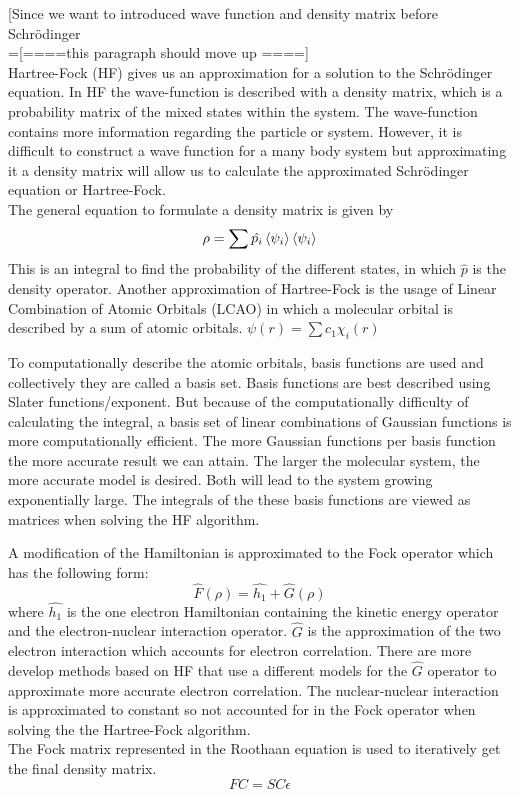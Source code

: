 \documentclass[twoside]{article}
\begin{document}
[Since we want to introduced wave function and density matrix before Schrödinger\\
=[====this paragraph should move up ====] \\
Hartree-Fock (HF) gives us an approximation for a solution to the Schrödinger equation. In HF the wave-function is described with a density matrix, which is a probability matrix of the mixed states within the system. The wave-function contains more information regarding the particle or system. However, it is difficult to construct a wave function for a many body system but approximating it a density matrix will allow us to calculate the approximated Schrödinger equation or Hartree-Fock. \\  

The general equation to formulate a density matrix is given by
\[
\rho = \sum\hat{p_i}\braket{\psi_i}\braket{\psi_i}
\]
This is an integral to find the probability of the different states, in which $\hat{p}$ is the density operator. Another approximation of Hartree-Fock is the usage of Linear Combination of Atomic Orbitals (LCAO) in which a molecular orbital is described by a sum of atomic orbitals. $\psi(r) = \sum{c_1\chi_i(r)}$


To computationally describe the atomic orbitals, basis functions are used and collectively they are called a basis set. Basis functions are best described using Slater functions/exponent. But because of the computationally difficulty of calculating the integral, a basis set of linear combinations of Gaussian functions is more computationally efficient. The more Gaussian functions per basis function the more accurate result we can attain. The larger the molecular system, the more accurate model is desired. Both will lead to the system growing exponentially large. The integrals of the these basis functions are viewed as matrices when solving the HF algorithm.

A modification of the Hamiltonian is approximated to the Fock operator which has the following form:
\[
\hat{F}(\rho) = \hat{h_1} + \hat{G}(\rho)
\]
where $\hat{h_1}$ is the one electron Hamiltonian containing the kinetic energy operator and the electron-nuclear interaction operator. $\hat{G}$ is the approximation of the two electron interaction which accounts for electron correlation. There are more develop methods based on HF that use a different models for the $\hat{G}$ operator to approximate more accurate electron correlation. The nuclear-nuclear interaction is approximated to constant so not accounted for in the Fock operator when solving the the Hartree-Fock algorithm. \\ 
The Fock matrix represented in the Roothaan equation is used to iteratively get the final density matrix.
\[
FC = SC\epsilon
\]
\end{document}
